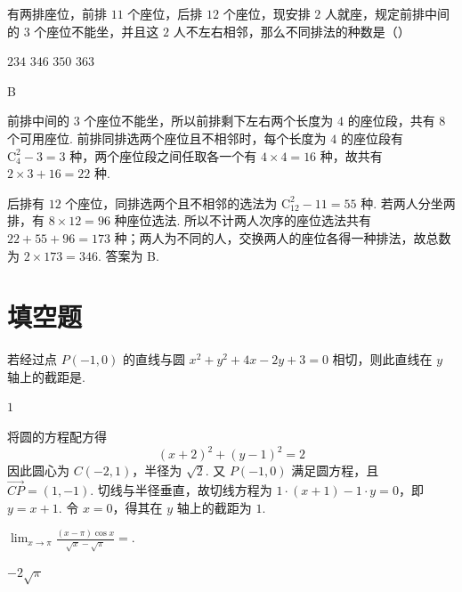 \begin{problem}
有两排座位，前排 \(11\) 个座位，后排 \(12\) 个座位，现安排 \(2\) 人就座，规定前排中间的 \(3\) 个座位不能坐，并且这 \(2\) 人不左右相邻，那么不同排法的种数是（\quad）

\choices
    {\(234\)}
    {\(346\)}
    {\(350\)}
    {\(363\)}
\end{problem}

\begin{answer}B\end{answer}

\begin{solution}
前排中间的 \(3\) 个座位不能坐，所以前排剩下左右两个长度为 \(4\) 的座位段，共有 \(8\) 个可用座位. 前排同排选两个座位且不相邻时，每个长度为 \(4\) 的座位段有 \(\mathrm C_4^2-3=3\) 种，两个座位段之间任取各一个有 \(4\times4=16\) 种，故共有 \(2\times3+16=22\) 种.

后排有 \(12\) 个座位，同排选两个且不相邻的选法为 \(\mathrm C_{12}^2-11=55\) 种. 若两人分坐两排，有 \(8\times12=96\) 种座位选法. 所以不计两人次序的座位选法共有 \(22+55+96=173\) 种；两人为不同的人，交换两人的座位各得一种排法，故总数为 \(2\times173=346\). 答案为 B.
\end{solution}

\section{填空题}
\begin{problem}
若经过点 \(P(-1,0)\) 的直线与圆 \(x^{2} + y^{2} + 4x - 2y + 3 = 0\) 相切，则此直线在 \(y\) 轴上的截距是\fillinblank{}.
\end{problem}

\begin{answer}\(1\)\end{answer}

\begin{solution}
将圆的方程配方得
\[
(x+2)^2+(y-1)^2=2
\]
因此圆心为 \(C(-2,1)\)，半径为 \(\sqrt2\). 又 \(P(-1,0)\) 满足圆方程，且
\(\overrightarrow{CP}=(1,-1)\). 切线与半径垂直，故切线方程为
\(1\cdot(x+1)-1\cdot y=0\)，即 \(y=x+1\). 令 \(x=0\)，得其在 \(y\) 轴上的截距为 \(1\).
\end{solution}

\begin{problem}
\(\displaystyle\lim_{x\to \pi}\frac{(x - \pi)\cos x}{\sqrt{x} - \sqrt{\pi}} =\)\fillinblank{}.
\end{problem}

\begin{answer}\(-2\sqrt{\pi}\)\end{answer}

